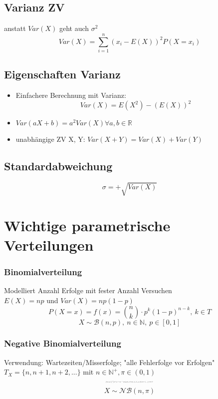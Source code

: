 \documentclass[10pt,a4paper,landscape]{article}
\begin{document}
\begin{multicols}{4}
\subsection{Varianz ZV}
anstatt $Var(X)$ geht auch $\sigma^2$
\[
Var(X) = \sum_{i=1}^n (x_i - E(X))^2P(X=x_i)
\]

\subsection*{Eigenschaften Varianz}
\begin{itemize}
\item Einfachere Berechnung mit Varianz:
\[
Var(X)=E(X^2)-(E(X))^2
\]
\item $Var(aX+b)=a^2Var(X) \forall a,b \in \mathbb{R}$
\item unabhängige ZV X, Y: $Var(X+Y)=Var(X)+Var(Y)$
\end{itemize}

\subsection{Standardabweichung}
\[
\sigma = + \sqrt{Var(X)}
\]


\section{Wichtige parametrische Verteilungen}

\subsubsection{Binomialverteilung}
Modelliert Anzahl Erfolge mit fester Anzahl Versuchen\\
$E(X)=np$ und $Var(X)=np(1-p)$
\[
P(X=x)=f(x)=\binom{n}{k} \cdot p^k(1-p)^{n-k}, ~ k \in T 
\]
\[
X \sim \mathcal{B}(n, p), ~ n \in \mathbb{N}, ~p \in [0,1]
\]

\subsubsection{Negative Binomialverteilung}
Verwendung: Wartezeiten/Misserfolge; "alle Fehlerfolge vor Erfolgen" \\
$T_X=\{n, n+1, n+2, ...\}$ mit $n \in \mathbb{N}^+, \pi \in (0,1)$
\[\resizebox{0.2\textwidth}{!}{$
f(x)=\binom{x-1}{n-1}\pi ^n(1-\pi)^{x-n}|(x \geq n), \pi \in (0,1), T_X=\{n, n+1, ...\} ~ n \in \mathbb{N}^+
$}
\]
\[
X \sim \mathcal{NB}(n, \pi)
\]


\end{multicols}
\end{document}
